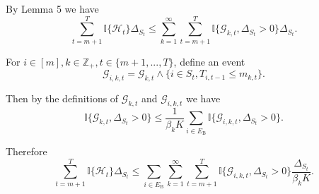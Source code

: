 \documentclass[opre,sglanonrev]{informs4}
\begin{document}
By Lemma 5 we have
$$\sum_{t=m+1}^T\mathbb{I} \{\mathcal{H}_t\}\Delta_{S_t}\leq\sum_{k=1}^\infty\sum_{t=m+1}^T\mathbb{I}\{\mathcal{G}_{k,t},\Delta_{S_t}>0\}\Delta_{S_t}.$$

For $i\in [m], k\in \mathbb{Z}_+, t\in \{m+1,...,T\}$, define an event
$$\mathcal{G}_{i,k,t}=\mathcal{G}_{k,t}\wedge\{i\in S_t,T_{i,t-1}\leq m_{k,t}\}.$$

Then by the definitions of $\mathcal{G}_{k,t}$ and $\mathcal{G}_{i,k,t}$ we have
$$\mathbb{I}\{\mathcal{G}_{k,t},\Delta_{S_t}>0\}\leq\frac{1}{\beta_kK}\sum_{i\in E_\mathrm{B}}\mathbb{I}\{\mathcal{G}_{i,k,t},\Delta_{S_t}>0\}.$$

Therefore
$$\sum_{t=m+1}^T\mathbb{I}\{\mathcal{H}_t\}\Delta_{S_t}\leq\sum_{i\in E_\mathrm{B}}\sum_{k=1}^\infty\sum_{t=m+1}^T\mathbb{I}\{\mathcal{G}_{i,k,t},\Delta_{S_t}>0\}\frac{\Delta_{S_t}}{\beta_kK}.$$
\end{document}
